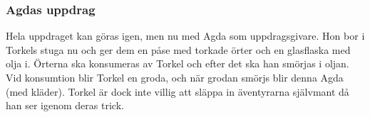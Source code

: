 \subsubsection{Agdas uppdrag}
Hela uppdraget kan göras igen, men nu med Agda som uppdragsgivare. Hon bor i Torkels stuga nu och ger dem en påse med torkade örter och en glasflaska med olja i. Örterna ska konsumeras av Torkel och efter det ska han smörjas i oljan. Vid konsumtion blir Torkel en groda, och när grodan smörjs blir denna Agda (med kläder). Torkel är dock inte villig att släppa in äventyrarna självmant då han ser igenom deras trick.
